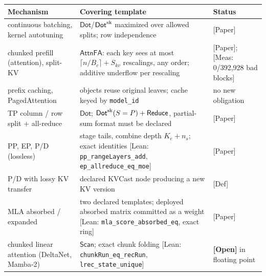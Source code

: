 \documentclass[10pt]{article}
\begin{document}
\begin{center}\small
\begin{tabularx}{\linewidth}{YYY}
\toprule
{}\textbf{Mechanism} & {}\textbf{Covering template} & {}\textbf{Status} \\
\midrule
{}continuous batching, kernel autotuning & {}$\mathsf{Dot}$/$\mathsf{Dot}^{\rm sk}$ maximized over allowed splits; row independence & {}[Paper] \\
{}chunked prefill (attention), split-KV & {}$\mathsf{AttnFA}$: each key sees at most $\lceil n/B_c\rceil+S_{kv}$ rescalings, any order; additive underflow per rescaling & {}[Paper]; [Meas: 0/392,928 bad blocks] \\
{}prefix caching, PagedAttention & {}objects reuse original leaves; cache keyed by \texttt{model\_\allowbreak{}id} & {}no new obligation \\
{}TP column / row split + all-reduce & {}$\mathsf{Dot}$; $\mathsf{Dot}^{\rm sk}(S=P)+\mathsf{Reduce}$, partial-sum format must be declared & {}[Paper] \\
{}PP, EP, P/D (lossless) & {}stage tails, combine depth $K_e+n_s$; exact identities [Lean: \texttt{pp\_\allowbreak{}rangeLayers\_\allowbreak{}add}, \texttt{ep\_\allowbreak{}allreduce\_\allowbreak{}eq\_\allowbreak{}moe}] & {}[Paper] \\
{}P/D with lossy KV transfer & {}declared KVCast node producing a new KV version & {}[Def] \\
{}MLA absorbed / expanded & {}two declared templates; deployed absorbed matrix committed as a weight [Lean: \texttt{mla\_\allowbreak{}score\_\allowbreak{}absorbed\_\allowbreak{}eq}, exact ring] & {}[Paper] \\
{}chunked linear attention (DeltaNet, Mamba-2) & {}$\mathsf{Scan}$; exact chunk folding [Lean: \texttt{chunkRun\_\allowbreak{}eq\_\allowbreak{}recRun}, \texttt{lrec\_\allowbreak{}state\_\allowbreak{}unique}] & {}\textbf{[Open]} in floating point \\
\bottomrule
\end{tabularx}
\end{center}
\end{document}
